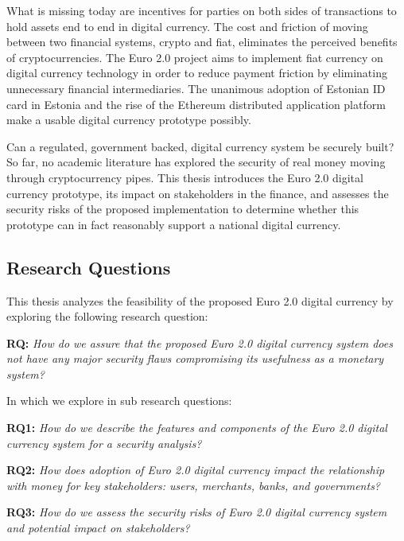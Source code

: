 \documentclass[a4paper,12pt]{article} %
\begin{document}
What is missing today are incentives for parties on both sides of transactions to hold assets end to end in digital currency. The cost and friction of moving between two financial systems, crypto and fiat, eliminates the perceived benefits of cryptocurrencies. The Euro 2.0 project aims to implement fiat currency on digital currency technology in order to reduce payment friction by eliminating unnecessary financial intermediaries. The unanimous adoption of Estonian ID card in Estonia and the rise of the Ethereum distributed application platform make a usable digital currency prototype possibly.

Can a regulated, government backed, digital currency system be securely built? So far, no academic literature has explored the security of real money moving through cryptocurrency pipes. This thesis introduces the Euro 2.0 digital currency prototype, its impact on stakeholders in the finance, and assesses the security risks of the proposed implementation to determine whether this prototype can in fact reasonably support a national digital currency.

\subsection{Research Questions} \label{ssec:1.2}

This thesis analyzes the feasibility of the proposed Euro 2.0 digital currency by exploring the following research question:
\begin{quoting}
	\textbf{RQ: }\textit{How do we assure that the proposed Euro 2.0 digital currency system does not have any major security flaws compromising its usefulness as a monetary system?}
\end{quoting}

In which we explore in sub research questions:
\begin{quoting}
\textbf{RQ1: }\textit{How do we describe the features and components of the Euro 2.0 digital currency system for a security analysis?}
\end{quoting}
\begin{quoting}
\textbf{RQ2: }\textit{How does adoption of Euro 2.0 digital currency impact the relationship with money for key stakeholders: users, merchants, banks, and governments?}
\end{quoting}
\begin{quoting}
\textbf{RQ3: }\textit{How do we assess the security risks of Euro 2.0 digital currency system and potential impact on stakeholders?}
\end{quoting}
\end{document}
